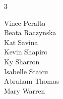 \documentclass{article}[10pt]
\begin{document}
\begin{center}
\begin{minipage}{117mm}
\begin{center}
{\begin{multicols*}{3}
\begin{center}
\begin{normalsize}
                                {Vince Peralta}\\
                                {Beata Raczynska}\\
                                {Kat Savina}\\
                                {Kevin Shapiro}\\
                                {Ky Sharron}\\
                                {Isabelle Staicu}\\
                                {Abraham Thomas}\\
                                {Mary Warren}
                            \end{normalsize}
                        \end{center}
                    \end{multicols*}
                }
            \end{center}

        \end{minipage}
    \end{center}

    \pagebreak

\end{document}
